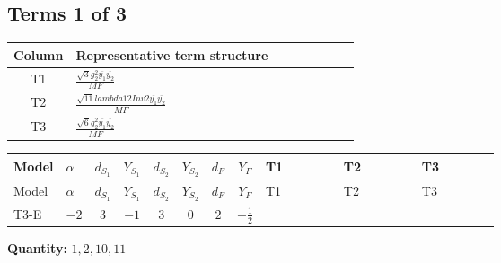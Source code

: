 \documentclass[8pt]{article}
\begin{document}
\begin{landscape}
\subsection*{Terms 1 of 3}
\begin{center}
\begin{tabular}{@{}c >{\raggedright\arraybackslash}p{0.82\linewidth}@{}}
\toprule
Column & Representative term structure \\
\midrule
T1 & \(\displaystyle \frac{\sqrt{3} g_{2}^{2} \overline{y_{1}} \overline{y_{2}}}{MF}\) \\
\midrule
T2 & \(\displaystyle \frac{\sqrt{11} lambda12Inv2 \overline{y_{1}} \overline{y_{2}}}{MF}\) \\
\midrule
T3 & \(\displaystyle \frac{\sqrt{6} g_{2}^{2} \overline{y_{1}} \overline{y_{2}}}{MF}\) \\
\midrule
\bottomrule
\end{tabular}
\end{center}
\smallskip
\tiny
\begin{longtable}{@{}llcccccc >{\raggedright\arraybackslash}p{0.21\linewidth} >{\raggedright\arraybackslash}p{0.21\linewidth} >{\raggedright\arraybackslash}p{0.21\linewidth}@{}}
\toprule
Model & $\alpha$ & $d_{S_1}$ & $Y_{S_1}$ & $d_{S_2}$ & $Y_{S_2}$ & $d_F$ & $Y_F$ & T1 & T2 & T3 \\
\midrule
\endfirsthead
\toprule
Model & $\alpha$ & $d_{S_1}$ & $Y_{S_1}$ & $d_{S_2}$ & $Y_{S_2}$ & $d_F$ & $Y_F$ & T1 & T2 & T3 \\
\midrule
\endhead
T3-E & $-2$ & $3$ & $-1$ & $3$ & $0$ & $2$ & $-\frac{1}{2}$ & \scriptsize\adjustbox{max width=\linewidth}{$\begin{gathered} - \frac{15 \sqrt{3} g_{2}^{2} \overline{y_{1}} \overline{y_{2}}}{8 MF}\end{gathered}$} & \scriptsize\adjustbox{max width=\linewidth}{$\begin{gathered} - \frac{3 \sqrt{11} lambda12Inv2 \overline{y_{1}} \overline{y_{2}}}{22 MF}\end{gathered}$} & \scriptsize\adjustbox{max width=\linewidth}{$\begin{gathered} - \frac{\sqrt{6} g_{2}^{2} \overline{y_{1}} \overline{y_{2}}}{6 MF}\end{gathered}$} \\
\midrule
\bottomrule
\end{longtable}
\clearpage
\noindent\textbf{Quantity: }$\mathrm{1,2,10,11}$\par\smallskip

\end{landscape}
\end{document}
